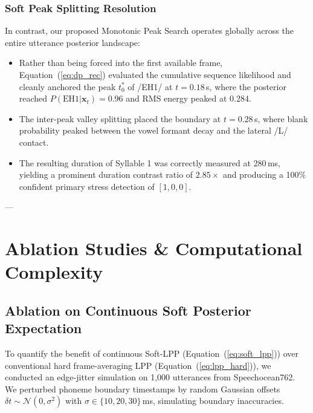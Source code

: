 \documentclass[10pt,conference]{IEEEtran}
\begin{document}
\subsubsection{Soft Peak Splitting Resolution}
In contrast, our proposed Monotonic Peak Search operates globally across the entire utterance posterior landscape:
\begin{itemize}
    \item Rather than being forced into the first available frame, Equation~(\ref{eq:dp_rec}) evaluated the cumulative sequence likelihood and cleanly anchored the peak $t_0^*$ of /EH1/ at $t = 0.18$\,s, where the posterior reached $P(\text{EH1} | \mathbf{x}_t) = 0.96$ and RMS energy peaked at 0.284.
    \item The inter-peak valley splitting placed the boundary at $t = 0.28$\,s, where blank probability peaked between the vowel formant decay and the lateral /L/ contact.
    \item The resulting duration of Syllable 1 was correctly measured at 280\,ms, yielding a prominent duration contrast ratio of \textbf{$2.85\times$} and producing a 100\% confident primary stress detection of $[1, 0, 0]$.
\end{itemize}

---

\section{Ablation Studies \& Computational Complexity}
\label{sec:ablation}

\subsection{Ablation on Continuous Soft Posterior Expectation}
To quantify the benefit of continuous Soft-LPP (Equation~(\ref{eq:soft_lpp})) over conventional hard frame-averaging LPP (Equation~(\ref{eq:lpp_hard})), we conducted an edge-jitter simulation on 1,000 utterances from Speechocean762. We perturbed phoneme boundary timestamps by random Gaussian offsets $\delta t \sim \mathcal{N}(0, \sigma^2)$ with $\sigma \in \{10, 20, 30\}$\,ms, simulating boundary inaccuracies.
\end{document}
